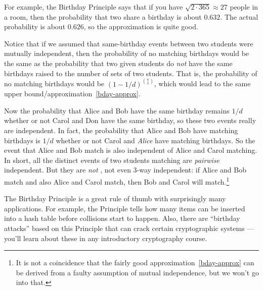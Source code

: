 
For example, the Birthday Principle says that if you have $\sqrt{2 \cdot
  365} \approx 27$ people in a room, then the probability that two share a
birthday is about $0.632$.  The actual probability is about $0.626$, so
the approximation is quite good.

Notice that if we assumed that same-birthday events between two students
were mutually independent, then the probability of no matching birthdays
would be the same as the probability that two given students do \emph{not}
have the same birthdays raised to the number of sets of two students.
That is, the probability of no matching birthdays would be
$(1-1/d)^{\binom{n}{2}}$, which would lead to the same upper
bound/approximation~\eqref{bday-approx}.

Now the probability that Alice and Bob have the same birthday remains
$1/d$ whether or not Carol and Don have the same birthday, so these two
events really are independent.  In fact, the probability that Alice and
Bob have matching birthdays is $1/d$ whether or not Carol and \emph{Alice}
have matching birthdays.  So the event that Alice and Bob match is also
independent of Alice and Carol matching.  In short, all the distinct
events of two students matching are 
\emph{pairwise} independent.  But they are \emph{not} , not even 3-way independent: if Alice and Bob match and
also Alice and Carol match, then Bob and Carol will match.\footnote{It is
  not a coincidence that the fairly good approximation~\eqref{bday-approx}
  can be derived from a faulty assumption of mutual independence, but we
  won't go into that.}

The Birthday Principle is a great rule of thumb with surprisingly many
applications.  For example, the Principle tells how many items can be
inserted into a hash table before collisions start to happen.  Also, there
are ``birthday attacks'' based on this Principle that can crack certain
cryptographic systems ---you'll learn about these in any introductory
cryptography course.

\endinput
